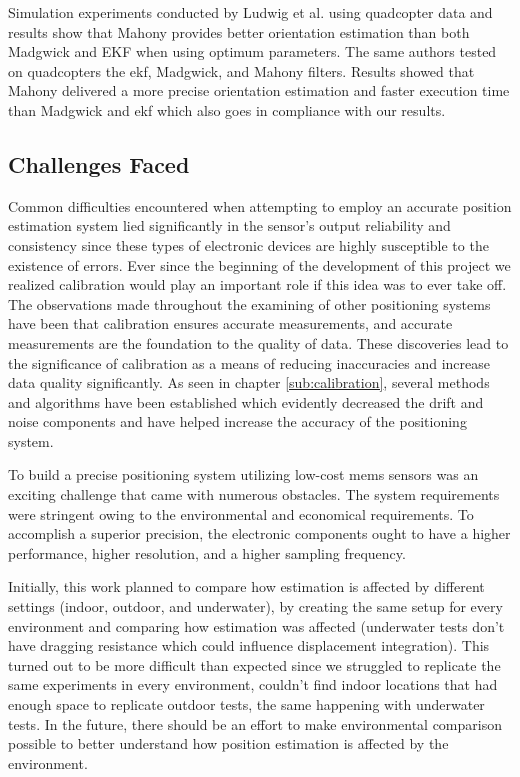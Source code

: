 Simulation experiments conducted by Ludwig et al. \cite{ludwig2018comparison} using quadcopter data and results show that Mahony provides better orientation estimation than both Madgwick and EKF when using optimum parameters. The same authors tested on \cite{ludwig2018comparisonuav} quadcopters the \acrshort{ekf}, Madgwick, and Mahony filters. Results showed that Mahony delivered a more precise orientation estimation and faster execution time than Madgwick and \acrshort{ekf} which also goes in compliance with our results.

\subsection{Challenges Faced}

Common difficulties encountered when attempting to employ an accurate position estimation system lied significantly in the sensor's output reliability and consistency since these types of electronic devices are highly susceptible to the existence of errors. Ever since the beginning of the development of this project we realized calibration would play an important role if this idea was to ever take off. The observations made throughout the examining of other positioning systems have been that calibration ensures accurate measurements, and accurate measurements are the foundation to the quality of data. These discoveries lead to the significance of calibration as a means of reducing inaccuracies and increase data quality significantly. As seen in chapter \ref{sub:calibration}, several methods and algorithms have been established which evidently decreased the drift and noise components and have helped increase the accuracy of the positioning system.

To build a precise positioning system utilizing low-cost \acrshort{mems} sensors was an exciting challenge that came with numerous obstacles. The system requirements were stringent owing to the environmental and economical requirements. To accomplish a superior precision, the electronic components ought to have a higher performance, higher resolution, and a higher sampling frequency.

Initially, this work planned to compare how estimation is affected by different settings (indoor, outdoor, and underwater), by creating the same setup for every environment and comparing how estimation was affected (underwater tests don't have dragging resistance which could influence displacement integration). This turned out to be more difficult than expected since we struggled to replicate the same experiments in every environment, couldn't find indoor locations that had enough space to replicate outdoor tests, the same happening with underwater tests. In the future, there should be an effort to make environmental comparison possible to better understand how position estimation is affected by the environment.


